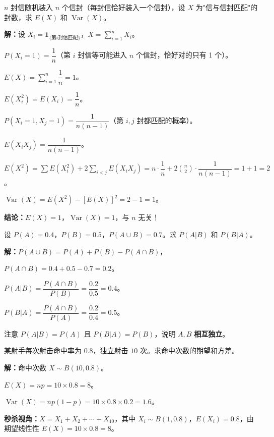 \documentclass[12pt, a4paper]{ctexart}
\begin{document}
\begin{examplebox}
$n$ 封信随机装入 $n$ 个信封（每封信恰好装入一个信封），设 $X$ 为"信与信封匹配"的封数，求 $E(X)$ 和 $\operatorname{Var}(X)$。
\end{examplebox}

\textbf{解：}\quad 设 $X_i=\mathbf{1}_{\{\text{第}i\text{封信匹配}\}}$，$X=\sum_{i=1}^{n}X_i$。\par
$P(X_i=1)=\dfrac{1}{n}$（第 $i$ 封信等可能进入 $n$ 个信封，恰好对的只有 1 个）。\par
$E(X)=\sum_{i=1}^{n}\dfrac{1}{n}=1$。\par
$E(X_i^2)=E(X_i)=\dfrac{1}{n}$。\par
$P(X_i=1,X_j=1)=\dfrac{1}{n(n-1)}$（第 $i,j$ 封都匹配的概率）。\par
$E(X_iX_j)=\dfrac{1}{n(n-1)}$。\par
$E(X^2)=\sum E(X_i^2)+2\sum_{i<j}E(X_iX_j)=n\cdot\dfrac{1}{n}+2\binom{n}{2}\cdot\dfrac{1}{n(n-1)}=1+1=2$。\par
$\operatorname{Var}(X)=E(X^2)-[E(X)]^2=2-1=1$。\par
\textbf{结论：}$E(X)=1$，$\operatorname{Var}(X)=1$，与 $n$ 无关！

\begin{examplebox}[【例题7】独立性与条件概率辨析]
设 $P(A)=0.4$，$P(B)=0.5$，$P(A\cup B)=0.7$。求 $P(A|B)$ 和 $P(B|A)$。
\end{examplebox}

\textbf{解：}\quad $P(A\cup B)=P(A)+P(B)-P(A\cap B)$，\par
$P(A\cap B)=0.4+0.5-0.7=0.2$。\par
$P(A|B)=\dfrac{P(A\cap B)}{P(B)}=\dfrac{0.2}{0.5}=0.4$。\par
$P(B|A)=\dfrac{P(A\cap B)}{P(A)}=\dfrac{0.2}{0.4}=0.5$。\par
注意 $P(A|B)=P(A)$ 且 $P(B|A)=P(B)$，说明 $A,B$ \textbf{相互独立}。

\begin{examplebox}[【例题8】二项分布与期望]
某射手每次射击命中率为 $0.8$，独立射击 $10$ 次。求命中次数的期望和方差。
\end{examplebox}

\textbf{解：}\quad 命中次数 $X\sim B(10,0.8)$。\par
$E(X)=np=10\times0.8=8$。\par
$\operatorname{Var}(X)=np(1-p)=10\times0.8\times0.2=1.6$。\par
\textbf{秒杀视角：}$X=X_1+X_2+\cdots+X_{10}$，其中 $X_i\sim B(1,0.8)$，$E(X_i)=0.8$，由期望线性性 $E(X)=10\times0.8=8$。
\end{document}
